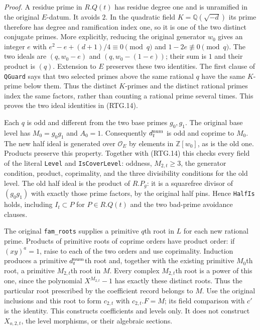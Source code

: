 \emph{Proof.}
A residue prime in $R.Q(t)$ has residue degree one and is unramified
in the original $E$-datum.  It avoids $2$.  In the quadratic field
$K=\mathbb Q(\sqrt{-d})$ its prime therefore has degree and ramification
index one, so it is one of the two distinct conjugate primes.  More
explicitly, reducing the original generator $w_0$ gives an integer $e$
with $e^2-e+(d+1)/4\equiv0\pmod q$ and $1-2e\not\equiv0\pmod q$.
The two ideals are $(q,w_0-e)$ and $(q,w_0-(1-e))$; their sum is $1$
and their product is $(q)$.  Extension to $E$ preserves these two
identities.  The first clause of \texttt{QGuard} says that two selected
primes above the same rational $q$ have the same $K$-prime below them.
Thus the distinct $K$-primes and the distinct rational primes index
the same factors, rather than counting a rational prime several times.
This proves the two ideal identities in (RTG.14).

Each $q$ is odd and different from the two base primes $g_0,g_1$.
The original base level has $M_0=g_0g_1$ and $A_0=1$.
Consequently $d_t^{\rm num}$ is odd and coprime to $M_0$.
The new half ideal is generated over $\mathcal O_E$ by elements in
$\mathbb Z[w_0]$, as is the old one.  Products preserve this property.
Together with (RTG.14) this checks every field of the literal
\texttt{Level} and \texttt{IsCoverLevel}: oddness, $M_{2,t}\ge3$,
the generator condition, product, coprimality, and the three divisibility
conditions for the old level.  The old half ideal is the product of
$R.P_g$: it is a squarefree divisor of $(g_0g_1)$ with exactly those
prime factors, by the original half pins.  Hence \texttt{HalfIs} holds,
including $I_t\subset P$ for $P\in R.Q(t)$ and the two bad-prime
avoidance clauses.

The original \texttt{fam\_\allowbreak roots} supplies a primitive $q$th root in
$L$ for each new rational prime.  Products of primitive roots of
coprime orders have product order: if $(xy)^a=1$, raise to each of the
two orders and use coprimality.  Induction produces a primitive
$d_t^{\rm num}$th root and, together with the existing primitive
$M_0$th root, a primitive $M_{2,t}$th root in $M$.
Every complex $M_{2,t}$th root is a power of this one, since the
polynomial $X^{M_{2,t}}-1$ has exactly these distinct roots.
Thus the particular root prescribed by the coefficient record belongs
to $M$.  Use the original inclusions and this root to form $c_{2,t}$
with $c_{2,t}.F=M$; its field comparison with $c'$ is the identity.
This constructs coefficients and levels only.  It does not construct
$X_{o,2,t}$, the level morphisms, or their algebraic sections.

